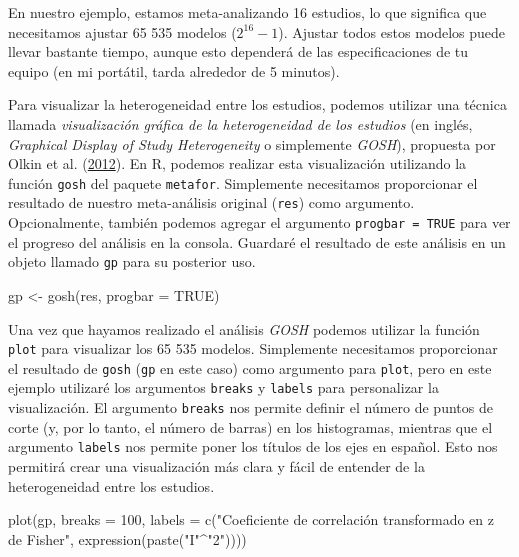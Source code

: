 \documentclass[
  bookmarksnumbered]{article}
\newenvironment{Shaded}{\begin{snugshade}}{\end{snugshade}}
\newcommand{\AttributeTok}[1]{\textcolor[rgb]{0.00,0.34,0.68}{#1}}
\newcommand{\ConstantTok}[1]{\textcolor[rgb]{0.67,0.33,0.00}{#1}}
\newcommand{\DecValTok}[1]{\textcolor[rgb]{0.69,0.50,0.00}{#1}}
\newcommand{\FunctionTok}[1]{\textcolor[rgb]{0.39,0.29,0.61}{#1}}
\newcommand{\NormalTok}[1]{\textcolor[rgb]{0.12,0.11,0.11}{#1}}
\newcommand{\OtherTok}[1]{\textcolor[rgb]{0.00,0.43,0.16}{#1}}
\newcommand{\SpecialCharTok}[1]{\textcolor[rgb]{0.24,0.68,0.91}{#1}}
\newcommand{\StringTok}[1]{\textcolor[rgb]{0.75,0.01,0.01}{#1}}
\begin{document}
En nuestro ejemplo, estamos meta-analizando 16 estudios, lo que significa que necesitamos ajustar 65 535 modelos (\(2^{16} - 1\)). Ajustar todos estos modelos puede llevar bastante tiempo, aunque esto dependerá de las especificaciones de tu equipo (en mi portátil, tarda alrededor de 5 minutos).

Para visualizar la heterogeneidad entre los estudios, podemos utilizar una técnica llamada \emph{visualización gráfica de la heterogeneidad de los estudios} (en inglés, \emph{Graphical Display of Study Heterogeneity} o simplemente \emph{GOSH}), propuesta por Olkin et al. (\protect\hyperlink{ref-olkinGOSHGraphicalDisplay2012}{2012}). En R, podemos realizar esta visualización utilizando la función \texttt{gosh} del paquete \texttt{metafor}. Simplemente necesitamos proporcionar el resultado de nuestro meta-análisis original (\texttt{res}) como argumento. Opcionalmente, también podemos agregar el argumento \texttt{progbar\ =\ TRUE} para ver el progreso del análisis en la consola. Guardaré el resultado de este análisis en un objeto llamado \texttt{gp} para su posterior uso.

\begin{Shaded}
\begin{Highlighting}[]
\NormalTok{gp }\OtherTok{\textless{}{-}} \FunctionTok{gosh}\NormalTok{(res, }\AttributeTok{progbar =} \ConstantTok{TRUE}\NormalTok{)}
\end{Highlighting}
\end{Shaded}

Una vez que hayamos realizado el análisis \emph{GOSH} podemos utilizar la función \texttt{plot} para visualizar los 65 535 modelos. Simplemente necesitamos proporcionar el resultado de \texttt{gosh} (\texttt{gp} en este caso) como argumento para \texttt{plot}, pero en este ejemplo utilizaré los argumentos \texttt{breaks} y \texttt{labels} para personalizar la visualización. El argumento \texttt{breaks} nos permite definir el número de puntos de corte (y, por lo tanto, el número de barras) en los histogramas, mientras que el argumento \texttt{labels} nos permite poner los títulos de los ejes en español. Esto nos permitirá crear una visualización más clara y fácil de entender de la heterogeneidad entre los estudios.

\begin{Shaded}
\begin{Highlighting}[]
\FunctionTok{plot}\NormalTok{(gp, }
     \AttributeTok{breaks =} \DecValTok{100}\NormalTok{,}
     \AttributeTok{labels =} \FunctionTok{c}\NormalTok{(}\StringTok{"Coeficiente de correlación transformado en z de Fisher"}\NormalTok{, }
                \FunctionTok{expression}\NormalTok{(}\FunctionTok{paste}\NormalTok{(}\StringTok{"I"}\SpecialCharTok{\^{}}\StringTok{"2"}\NormalTok{))))}
\end{Highlighting}
\end{Shaded}
\end{document}
